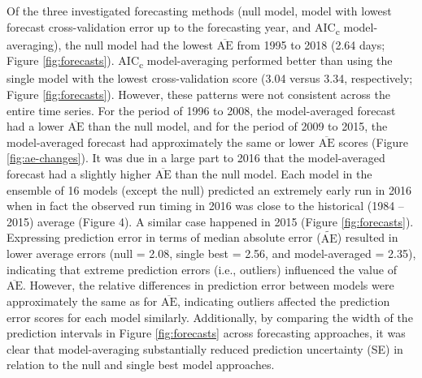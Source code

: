 \documentclass[12pt,]{book}
\theoremstyle{definition}
\theoremstyle{definition}
\theoremstyle{definition}
\theoremstyle{remark}
\begin{document}
\noindent
Of the three investigated forecasting methods (null model, model with
lowest forecast cross-validation error up to the forecasting year, and
AIC\textsubscript{c} model-averaging), the null model had the lowest
\(\overline{\text{AE}}\) from 1995 to 2018 (2.64 days; Figure
\ref{fig:forecasts}). AIC\textsubscript{c} model-averaging performed
better than using the single model with the lowest cross-validation
score (3.04 versus 3.34, respectively; Figure \ref{fig:forecasts}).
However, these patterns were not consistent across the entire time
series. For the period of 1996 to 2008, the model-averaged forecast had
a lower \(\overline{\text{AE}}\) than the null model, and for the period
of 2009 to 2015, the model-averaged forecast had approximately the same
or lower \(\overline{\text{AE}}\) scores (Figure \ref{fig:ae-changes}).
It was due in a large part to 2016 that the model-averaged forecast had
a slightly higher \(\overline{\text{AE}}\) than the null model. Each
model in the ensemble of 16 models (except the null) predicted an
extremely early run in 2016 when in fact the observed run timing in 2016
was close to the historical (1984 -- 2015) average (Figure 4). A similar
case happened in 2015 (Figure \ref{fig:forecasts}). Expressing
prediction error in terms of median absolute error
(\(\widetilde{\text{AE}}\)) resulted in lower average errors (null =
2.08, single best = 2.56, and model-averaged = 2.35), indicating that
extreme prediction errors (i.e., outliers) influenced the value of
\(\overline{\text{AE}}\). However, the relative differences in
prediction error between models were approximately the same as for
\(\overline{\text{AE}}\), indicating outliers affected the prediction
error scores for each model similarly. Additionally, by comparing the
width of the prediction intervals in Figure \ref{fig:forecasts} across
forecasting approaches, it was clear that model-averaging substantially
reduced prediction uncertainty (SE) in relation to the null and single
best model approaches.
\end{document}
